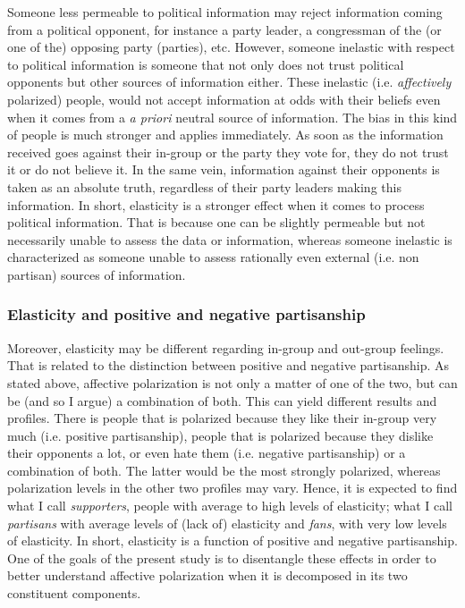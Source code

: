 \documentclass[a4paper, svgnames]{article}
\begin{document}
Someone less permeable to political information may reject information coming from a political opponent, for instance a party leader, a congressman of the (or one of the) opposing party (parties), etc. However, someone inelastic with respect to political information is someone that not only does not trust political opponents but other sources of information either. These inelastic (i.e. \textit{affectively} polarized) people, would not accept information at odds with their beliefs even when it comes from a \textit{a priori} neutral source of information. The bias in this kind of people is much stronger and applies immediately. As soon as the information received goes against their in-group or the party they vote for, they do not trust it or do not believe it. In the same vein, information against their opponents is taken as an absolute truth, regardless of their party leaders making this information. In short, elasticity is a stronger effect when it comes to process political information. That is because one can be slightly permeable but not necessarily unable to assess the data or information, whereas someone inelastic is characterized as someone unable to assess rationally even external (i.e. non partisan) sources of information.

\subsubsection{Elasticity and positive and negative partisanship}

Moreover, elasticity may be different regarding in-group and out-group feelings. That is related to the distinction between positive and negative partisanship. As stated above, affective polarization is not only a matter of one of the two, but can be (and so I argue) a combination of both. This can yield different results and profiles. There is people that is polarized because they like their in-group very much (i.e. positive partisanship), people that is polarized because they dislike their opponents a lot, or even hate them (i.e. negative partisanship) or a combination of both. The latter would be the most strongly polarized, whereas polarization levels in the other two profiles may vary. Hence, it is expected to find what I call \textit{supporters}, people with average to high levels of elasticity; what I call \textit{partisans} with average levels of (lack of) elasticity and \textit{fans}, with very low levels of elasticity. In short, elasticity is a function of positive and negative partisanship. One of the goals of the present study is to disentangle these effects in order to better understand affective polarization when it is decomposed in its two constituent components.
\end{document}
